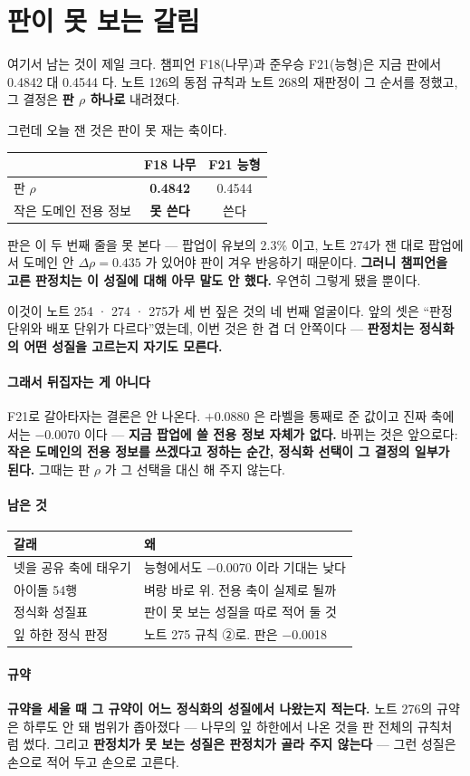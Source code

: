 \documentclass[10pt]{article}
\begin{document}
\section{판이 못 보는 갈림}

여기서 남는 것이 제일 크다. 챔피언 F18(나무)과 준우승 F21(능형)은 지금
판에서 0.4842 대 0.4544 다. 노트 126의 동점 규칙과 노트 268의 재판정이
그 순서를 정했고, 그 결정은 \textbf{판 $\rho$ 하나로} 내려졌다.

그런데 오늘 잰 것은 판이 못 재는 축이다.

\begin{center}\small
\begin{tabular}{lcc}
\hline
& F18 나무 & F21 능형 \\
\hline
판 $\rho$ & \textbf{0.4842} & 0.4544 \\
작은 도메인 전용 정보 & \textbf{못 쓴다} & 쓴다 \\
\hline
\end{tabular}
\end{center}

판은 이 두 번째 줄을 못 본다 --- 팝업이 유보의 2.3\% 이고, 노트 274가 잰
대로 팝업에서 도메인 안 $\Delta\rho{=}0.435$ 가 있어야 판이 겨우 반응하기
때문이다. \textbf{그러니 챔피언을 고른 판정치는 이 성질에 대해 아무 말도
안 했다.} 우연히 그렇게 됐을 뿐이다.

이것이 노트 254 · 274 · 275가 세 번 짚은 것의 네 번째 얼굴이다. 앞의 셋은
``판정 단위와 배포 단위가 다르다''였는데, 이번 것은 한 겹 더 안쪽이다 ---
\textbf{판정치는 정식화의 어떤 성질을 고르는지 자기도 모른다.}

\paragraph{그래서 뒤집자는 게 아니다} F21로 갈아타자는 결론은 안 나온다.
$+$0.0880 은 라벨을 통째로 준 값이고 진짜 축에서는 $-$0.0070 이다 ---
\textbf{지금 팝업에 쓸 전용 정보 자체가 없다.} 바뀌는 것은 앞으로다:
\textbf{작은 도메인의 전용 정보를 쓰겠다고 정하는 순간, 정식화 선택이 그
결정의 일부가 된다.} 그때는 판 $\rho$ 가 그 선택을 대신 해 주지 않는다.

\paragraph{남은 것}
\begin{center}\small
\begin{tabular}{ll}
\hline
갈래 & 왜 \\
\hline
넷을 공유 축에 태우기 & 능형에서도 $-$0.0070 이라 기대는 낮다 \\
아이돌 54행 & 벼랑 바로 위. 전용 축이 실제로 될까 \\
정식화 성질표 & 판이 못 보는 성질을 따로 적어 둘 것 \\
잎 하한 정식 판정 & 노트 275 규칙 ②로. 판은 $-$0.0018 \\
\hline
\end{tabular}
\end{center}

\paragraph{규약} \textbf{규약을 세울 때 그 규약이 어느 정식화의 성질에서
나왔는지 적는다.} 노트 276의 규약은 하루도 안 돼 범위가 좁아졌다 --- 나무의
잎 하한에서 나온 것을 판 전체의 규칙처럼 썼다. 그리고 \textbf{판정치가 못
보는 성질은 판정치가 골라 주지 않는다} --- 그런 성질은 손으로 적어 두고
손으로 고른다.
\end{document}

